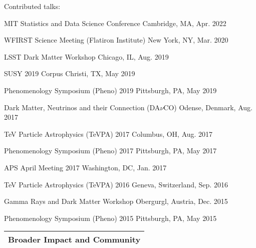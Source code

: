 \documentclass[letterpaper,11pt]{article}
\newenvironment{packed_itemize}{
\begin{itemize}[label=\raisebox{0.25ex}{\tiny$\bullet$}]
  \setlength{\itemsep}{4.2pt}
  \setlength{\parskip}{0pt}
  \setlength{\parsep}{0pt}}{\end{itemize}
}
\begin{document}
\noindent
Contributed talks:
\begin{packed_itemize}
  \item MIT Statistics and Data Science Conference  \hfill Cambridge, MA, Apr. 2022
  \item WFIRST Science Meeting (Flatiron Institute) \hfill New York, NY, Mar. 2020
  \item LSST Dark Matter Workshop \hfill Chicago, IL, Aug. 2019
  \item SUSY 2019 \hfill Corpus Christi, TX, May 2019
  \item Phenomenology Symposium (Pheno) 2019 \hfill Pittsburgh, PA, May 2019
  \item Dark Matter, Neutrinos and their Connection (DA$\nu$CO) \hfill Odense, Denmark, Aug. 2017
  \item TeV Particle Astrophysics (TeVPA) 2017 \hfill Columbus, OH, Aug. 2017 
  \item Phenomenology Symposium (Pheno) 2017 \hfill Pittsburgh, PA, May 2017 
  \item APS April Meeting 2017 \hfill Washington, DC, Jan. 2017 
  \item TeV Particle Astrophysics (TeVPA) 2016 \hfill Geneva, Switzerland, Sep. 2016 
  \item Gamma Rays and Dark Matter Workshop \hfill Obergurgl, Austria, Dec. 2015
  \item Phenomenology Symposium (Pheno) 2015 \hfill Pittsburgh, PA, May 2015
\end{packed_itemize}
\vspace{2.0mm}


 
\noindent
\begin{tabular*}{\textwidth}{l@{\extracolsep{\fill}}}
\large {\sc \Large{Broader Impact and Community}}\\
\hline
\end{tabular*}\vspace{1.mm}
\end{document}
